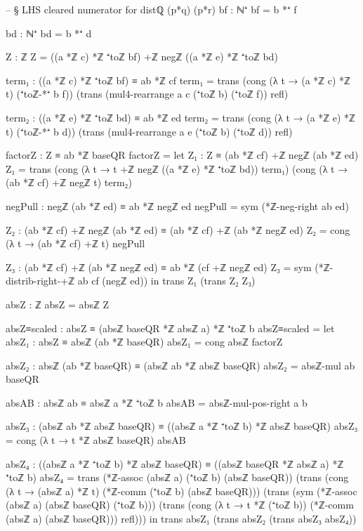\documentclass[11pt,a4paper]{book}
\begin{document}
\begin{code}
    -- § LHS cleared numerator for distℚ (p*q) (p*r)
    bf : ℕ⁺
    bf = b *⁺ f

    bd : ℕ⁺
    bd = b *⁺ d

    Z : ℤ
    Z = ((a *ℤ c) *ℤ ⁺toℤ bf) +ℤ negℤ ((a *ℤ e) *ℤ ⁺toℤ bd)

    term₁ : ((a *ℤ c) *ℤ ⁺toℤ bf) ≡ ab *ℤ cf
    term₁ =
      trans
        (cong (λ t → (a *ℤ c) *ℤ t) (⁺toℤ-*⁺ b f))
        (trans
          (mul4-rearrange a c (⁺toℤ b) (⁺toℤ f))
          refl)

    term₂ : ((a *ℤ e) *ℤ ⁺toℤ bd) ≡ ab *ℤ ed
    term₂ =
      trans
        (cong (λ t → (a *ℤ e) *ℤ t) (⁺toℤ-*⁺ b d))
        (trans
          (mul4-rearrange a e (⁺toℤ b) (⁺toℤ d))
          refl)

    factorZ : Z ≡ ab *ℤ baseQR
    factorZ =
      let
        Z₁ : Z ≡ (ab *ℤ cf) +ℤ negℤ (ab *ℤ ed)
        Z₁ =
          trans
            (cong (λ t → t +ℤ negℤ ((a *ℤ e) *ℤ ⁺toℤ bd)) term₁)
            (cong (λ t → (ab *ℤ cf) +ℤ negℤ t) term₂)

        negPull : negℤ (ab *ℤ ed) ≡ ab *ℤ negℤ ed
        negPull = sym (*ℤ-neg-right ab ed)

        Z₂ : (ab *ℤ cf) +ℤ negℤ (ab *ℤ ed) ≡ (ab *ℤ cf) +ℤ (ab *ℤ negℤ ed)
        Z₂ = cong (λ t → (ab *ℤ cf) +ℤ t) negPull

        Z₃ : (ab *ℤ cf) +ℤ (ab *ℤ negℤ ed) ≡ ab *ℤ (cf +ℤ negℤ ed)
        Z₃ = sym (*ℤ-distrib-right-+ℤ ab cf (negℤ ed))
      in
      trans Z₁ (trans Z₂ Z₃)

    absZ : ℤ
    absZ = absℤ Z

    absZ≡scaled : absZ ≡ (absℤ baseQR *ℤ absℤ a) *ℤ ⁺toℤ b
    absZ≡scaled =
      let
        absZ₁ : absZ ≡ absℤ (ab *ℤ baseQR)
        absZ₁ = cong absℤ factorZ

        absZ₂ : absℤ (ab *ℤ baseQR) ≡ (absℤ ab *ℤ absℤ baseQR)
        absZ₂ = absℤ-mul ab baseQR

        absAB : absℤ ab ≡ absℤ a *ℤ ⁺toℤ b
        absAB = absℤ-mul-pos-right a b

        absZ₃ : (absℤ ab *ℤ absℤ baseQR) ≡ ((absℤ a *ℤ ⁺toℤ b) *ℤ absℤ baseQR)
        absZ₃ = cong (λ t → t *ℤ absℤ baseQR) absAB

        absZ₄ : ((absℤ a *ℤ ⁺toℤ b) *ℤ absℤ baseQR) ≡ ((absℤ baseQR *ℤ absℤ a) *ℤ ⁺toℤ b)
        absZ₄ =
          trans
            (*ℤ-assoc (absℤ a) (⁺toℤ b) (absℤ baseQR))
            (trans
              (cong (λ t → (absℤ a) *ℤ t) (*ℤ-comm (⁺toℤ b) (absℤ baseQR)))
              (trans
                (sym (*ℤ-assoc (absℤ a) (absℤ baseQR) (⁺toℤ b)))
                (trans
                  (cong (λ t → t *ℤ (⁺toℤ b)) (*ℤ-comm (absℤ a) (absℤ baseQR)))
                  refl)))
      in
      trans absZ₁ (trans absZ₂ (trans absZ₃ absZ₄))


\end{code}
\end{document}
